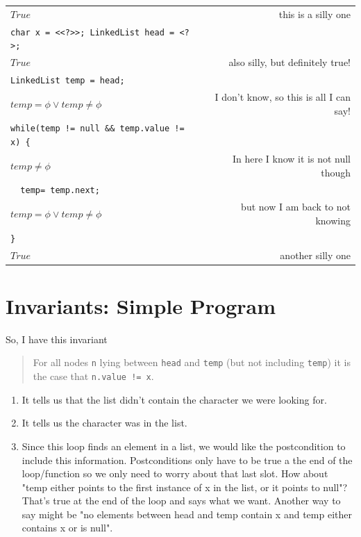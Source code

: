\documentclass[twoside=false,DIV=14]{scrartcl}
\begin{document}
\vspace{1em}
\begin{tabular}{l r}
\hspace{4em}$True$  & this is a silly one \\
\verb|char x = <<?>>; LinkedList head = <?>;| \\
\hspace{4em}$True$ & also silly, but definitely true! \\
\verb|LinkedList temp = head;| \\
\hspace{4em}$temp = \phi \lor temp \neq \phi$ & I don't know, so this is all I can say! \\
\verb|while(temp != null && temp.value != x) {| \\
\hspace{4em}$temp \neq \phi$ & In here I know it is not null though \\
\verb|  temp= temp.next;| \\
\hspace{4em}$temp = \phi \lor temp \neq \phi$ & but now I am back to not knowing \\
\verb|}| \\
\hspace{4em}$True$ & another silly one \\
\end{tabular}
  

\section{Invariants: Simple Program}

So, I have this invariant
\begin{quotation}
  For all nodes {\tt n} lying between {\tt head} and {\tt temp} (but not including {\tt temp}) it is the case that {\tt n.value != x}.
  \end{quotation}

\begin{enumerate}
\item It tells us that the list didn't contain the character we were looking for.
\item It tells us the character was in the list.
\item Since this loop finds an element in a list, we would like the postcondition to include this information.  Postconditions only have to be true a the end of the loop/function so we only need to worry about that last slot.  How about "temp either points to the first instance of x in the list, or it points to null"?  That's true at the end of the loop and says what we want.  Another way to say might be "no elements between head and temp contain x and temp either contains x or is null".
\end{enumerate}
\end{document}
